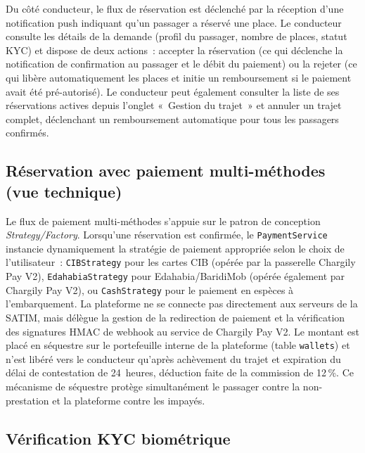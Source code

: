 Du côté conducteur, le flux de réservation est déclenché par la réception d'une notification push indiquant qu'un passager a réservé une place. Le conducteur consulte les détails de la demande (profil du passager, nombre de places, statut KYC) et dispose de deux actions~: accepter la réservation (ce qui déclenche la notification de confirmation au passager et le débit du paiement) ou la rejeter (ce qui libère automatiquement les places et initie un remboursement si le paiement avait été pré-autorisé). Le conducteur peut également consulter la liste de ses réservations actives depuis l'onglet «~Gestion du trajet~» et annuler un trajet complet, déclenchant un remboursement automatique pour tous les passagers confirmés.

\subsection{Réservation avec paiement multi-méthodes (vue technique)}
\label{sec:seq-paiement}

Le flux de paiement multi-méthodes s'appuie sur le patron de conception \textit{Strategy/Factory}. Lorsqu'une réservation est confirmée, le \texttt{PaymentService} instancie dynamiquement la stratégie de paiement appropriée selon le choix de l'utilisateur~: \texttt{CIBStrategy} pour les cartes CIB (opérée par la passerelle Chargily Pay V2), \texttt{EdahabiaStrategy} pour Edahabia/BaridiMob (opérée également par Chargily Pay V2), ou \texttt{CashStrategy} pour le paiement en espèces à l'embarquement. La plateforme ne se connecte pas directement aux serveurs de la SATIM, mais délègue la gestion de la redirection de paiement et la vérification des signatures HMAC de webhook au service de Chargily Pay V2. Le montant est placé en séquestre sur le portefeuille interne de la plateforme (table \texttt{wallets}) et n'est libéré vers le conducteur qu'après achèvement du trajet et expiration du délai de contestation de 24~heures, déduction faite de la commission de 12\,\%. Ce mécanisme de séquestre protège simultanément le passager contre la non-prestation et la plateforme contre les impayés.

\subsection{Vérification KYC biométrique}
\label{sec:seq-kyc}

